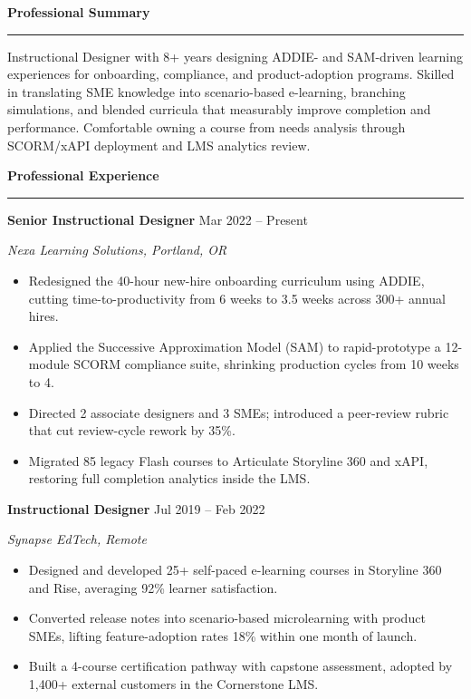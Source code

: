 \documentclass[10pt]{article}
\newcommand{\sidetitle}[1]{%
  {\color{accent}\bfseries\fontsize{10.5}{12}\selectfont #1}\par
  \vspace{1pt}
  {\color{accent}\rule{\linewidth}{0.9pt}}\par
  \vspace{3pt}
}
\newcommand{\jobheader}[3]{%
  {\color{darktext}\bfseries #1} \hfill {\color{graytext}\small #3}\par
  {\color{accent}\itshape\small #2}\par
  \vspace{2pt}
}
\begin{document}
\hfill
\begin{minipage}[t]{0.645\textwidth}

\sidetitle{Professional Summary}
{\small\color{darktext}
Instructional Designer with 8+ years designing ADDIE- and SAM-driven learning experiences for
onboarding, compliance, and product-adoption programs. Skilled in translating SME knowledge into
scenario-based e-learning, branching simulations, and blended curricula that measurably improve
completion and performance. Comfortable owning a course from needs analysis through SCORM/xAPI
deployment and LMS analytics review.
}\par

\vspace{9pt}
\sidetitle{Professional Experience}

\jobheader{Senior Instructional Designer}{Nexa Learning Solutions, Portland, OR}{Mar 2022 -- Present}
\begin{itemize}[leftmargin=12pt, itemsep=2pt, topsep=0pt, parsep=0pt, label={\small\color{accent}\textbullet}]
  \item \small Redesigned the 40-hour new-hire onboarding curriculum using ADDIE, cutting time-to-productivity from 6 weeks to 3.5 weeks across 300+ annual hires.
  \item \small Applied the Successive Approximation Model (SAM) to rapid-prototype a 12-module SCORM compliance suite, shrinking production cycles from 10 weeks to 4.
  \item \small Directed 2 associate designers and 3 SMEs; introduced a peer-review rubric that cut review-cycle rework by 35\%.
  \item \small Migrated 85 legacy Flash courses to Articulate Storyline 360 and xAPI, restoring full completion analytics inside the LMS.
\end{itemize}

\vspace{6pt}
\jobheader{Instructional Designer}{Synapse EdTech, Remote}{Jul 2019 -- Feb 2022}
\begin{itemize}[leftmargin=12pt, itemsep=2pt, topsep=0pt, parsep=0pt, label={\small\color{accent}\textbullet}]
  \item \small Designed and developed 25+ self-paced e-learning courses in Storyline 360 and Rise, averaging 92\% learner satisfaction.
  \item \small Converted release notes into scenario-based microlearning with product SMEs, lifting feature-adoption rates 18\% within one month of launch.
  \item \small Built a 4-course certification pathway with capstone assessment, adopted by 1,400+ external customers in the Cornerstone LMS.
\end{itemize}


\end{minipage}
\end{document}
